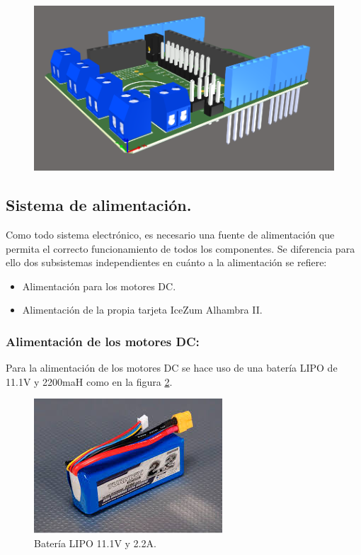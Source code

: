 \begin{center}
	\begin{figure}[H]
		\center
		\includegraphics[scale=0.8]{imagenes/Balancing_Robot/Vista3D2.PNG}
		\caption{}
		\label{fig:Vista3D2}
	\end{figure}
\end{center}

\subsection{Sistema de alimentación.} \label{sec:Bateria}

Como todo sistema electrónico, es necesario una fuente de alimentación que permita el correcto funcionamiento de todos los componentes.  \newline
Se diferencia para ello dos subsistemas independientes en cuánto a la alimentación se refiere:
\begin{itemize}
	\item Alimentación para los motores DC.
	\item Alimentación de la propia tarjeta IceZum Alhambra II.
\end{itemize}

\subsubsection{Alimentación de los motores DC:}
Para la alimentación de los motores DC se hace uso de una batería LIPO de 11.1V y 2200maH como en la figura \ref{fig:lipo111}.

\begin{center}
	\begin{figure}[H]
		\center
		\includegraphics[scale=0.8]{imagenes/Balancing_Robot/LIPO111}
		\caption{Batería LIPO 11.1V y 2.2A. }
		\label{fig:lipo111}
	\end{figure}
\end{center}

